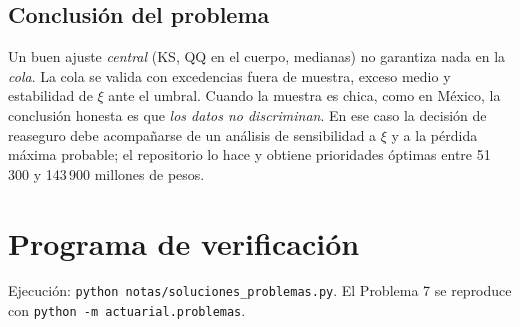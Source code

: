 \documentclass[11pt,reqno]{amsart}
\theoremstyle{definition}\newtheorem{definition}[theorem]{Definición}
\theoremstyle{remark}\newtheorem{remark}[theorem]{Observación}
\begin{document}
\subsection{Conclusión del problema}
Un buen ajuste \emph{central} (KS, QQ en el cuerpo, medianas) no garantiza nada en la \emph{cola}. La cola se valida con excedencias fuera de muestra, exceso medio y estabilidad de $\xi$ ante el umbral. Cuando la muestra es chica, como en México, la conclusión honesta es que \emph{los datos no discriminan}. En ese caso la decisión de reaseguro debe acompañarse de un análisis de sensibilidad a $\xi$ y a la pérdida máxima probable; el repositorio lo hace y obtiene prioridades óptimas entre 51\,300 y 143\,900 millones de pesos.

\appendix
\section{Programa de verificación}
Ejecución: \texttt{python notas/soluciones\_problemas.py}. El Problema 7 se reproduce con \texttt{python -m actuarial.problemas}.

\end{document}
